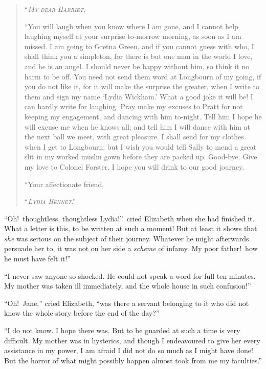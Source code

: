 \documentclass[12pt,english]{book}
\newcommand{\noun}[1]{\textsc{#1}}
\begin{document}
\begin{quotation}
\noindent {}``\textit{\emph{\noun{My}}} \textit{\emph{\noun{dear}}}
\textit{\emph{\noun{Harriet}}},

{}``You will laugh when you know where I am gone, and I cannot help
laughing myself at your surprise to-morrow morning, as soon as I am
missed. I am going to Gretna Green, and if you cannot guess with who,
I shall think you a simpleton, for there is but one man in the world
I love, and he is an angel. I should never be happy without him, so
think it no harm to be off. You need not send them word at Longbourn
of my going, if you do not like it, for it will make the surprise
the greater, when I write to them and sign my name `Lydia Wickham.'
What a good joke it will be! I can hardly write for laughing. Pray
make my excuses to Pratt for not keeping my engagement, and dancing
with him to-night. Tell him I hope he will excuse me when he knows
all; and tell him I will dance with him at the next ball we meet,
with great pleasure. I shall send for my clothes when I get to Longbourn;
but I wish you would tell Sally to mend a great slit in my worked
muslin gown before they are packed up. Good-bye. Give my love to Colonel
Forster. I hope you will drink to our good journey.

{}``Your affectionate friend,

``\textit{\emph{\noun{Lydia}}} \textit{\emph{\noun{Bennet}}}.'' 
\end{quotation}
{}``Oh!\ thoughtless, thoughtless Lydia!''\ cried Elizabeth when
she had finished it. What a letter is this, to be written at such
a moment! But at least it shows that \textit{she} was serious on the
subject of their journey. Whatever he might afterwards persuade her
to, it was not on her side a \textit{scheme} of infamy. My poor father!\ how
he must have felt it!''\ 

{}``I never saw anyone so shocked. He could not speak a word for
full ten minutes. My mother was taken ill immediately, and the whole
house in such confusion!''\ 

{}``Oh!\ Jane,'' cried Elizabeth, {}``was there a servant belonging
to it who did not know the whole story before the end of the day?''\ 

{}``I do not know. I hope there was. But to be guarded at such a
time is very difficult. My mother was in hysterics, and though I endeavoured
to give her every assistance in my power, I am afraid I did not do
so much as I might have done! But the horror of what might possibly
happen almost took from me my faculties.''
\end{document}
